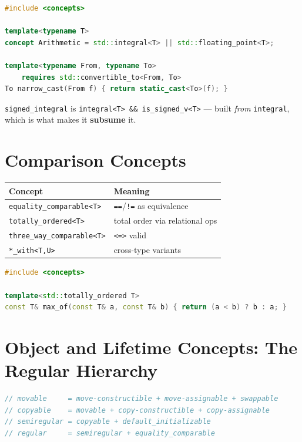 \begin{lstlisting}[language=C++,caption={Composing core concepts}]
#include <concepts>

template<typename T>
concept Arithmetic = std::integral<T> || std::floating_point<T>;

template<typename From, typename To>
    requires std::convertible_to<From, To>
To narrow_cast(From f) { return static_cast<To>(f); }
\end{lstlisting}

\texttt{signed\_integral} is \texttt{integral<T> \&\& is\_signed\_v<T>} --- built \emph{from} \texttt{integral}, which is what makes it \textbf{subsume} it.

\section{Comparison Concepts}
\label{sec:c20-comparison-concepts}

\begin{center}
\begin{tabular}{ll}
\hline
\textbf{Concept} & \textbf{Meaning} \\
\hline
\texttt{equality\_comparable<T>} & \texttt{==}/\texttt{!=} as equivalence \\
\texttt{totally\_ordered<T>} & total order via relational ops \\
\texttt{three\_way\_comparable<T>} & \texttt{<=>} valid \\
\texttt{*\_with<T,U>} & cross-type variants \\
\hline
\end{tabular}
\end{center}

\begin{lstlisting}[language=C++,caption={Constraining on comparability}]
#include <concepts>

template<std::totally_ordered T>
const T& max_of(const T& a, const T& b) { return (a < b) ? b : a; }
\end{lstlisting}

\section{Object and Lifetime Concepts: The Regular Hierarchy}
\label{sec:c20-regular-hierarchy}

\begin{lstlisting}[language=C++,caption={The object-concept hierarchy (paraphrased)}]
// movable     = move-constructible + move-assignable + swappable
// copyable    = movable + copy-constructible + copy-assignable
// semiregular = copyable + default_initializable
// regular     = semiregular + equality_comparable
\end{lstlisting}

